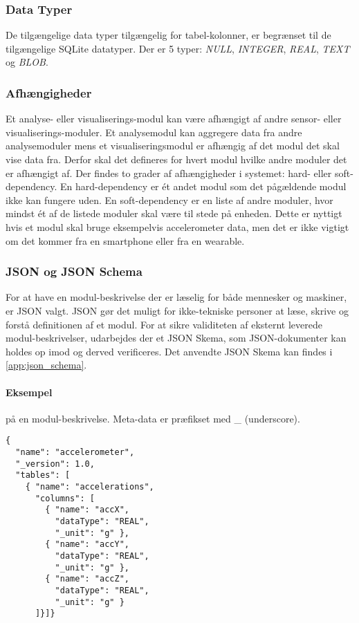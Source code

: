 \subsubsection{Data Typer}
De tilgængelige data typer tilgængelig for tabel-kolonner, er begrænset til de tilgængelige SQLite datatyper.
Der er 5 typer: \textit{NULL}, \textit{INTEGER}, \textit{REAL}, \textit{TEXT} og \textit{BLOB}.

\subsubsection{Afhængigheder}
Et analyse- eller visualiserings-modul kan være afhængigt af andre sensor- eller visualiserings-moduler.
Et analysemodul kan aggregere data fra andre analysemoduler mens et visualiseringsmodul er afhængig af det modul det skal vise data fra.
Derfor skal det defineres for hvert modul hvilke andre moduler det er afhængigt af.
Der findes to grader af afhængigheder i systemet: hard- eller soft-dependency.
En hard-dependency er ét andet modul som det pågældende modul ikke kan fungere uden.
En soft-dependency er en liste af andre moduler, hvor mindst ét af de listede moduler skal være til stede på enheden.
Dette er nyttigt hvis et modul skal bruge eksempelvis accelerometer data, men det er ikke vigtigt om det kommer fra en smartphone eller fra en wearable.

\subsubsection{JSON og JSON Schema}
For at have en modul-beskrivelse der er læselig for både mennesker og maskiner, er JSON valgt.
JSON gør det muligt for ikke-tekniske personer at læse, skrive og forstå definitionen af et modul.
For at sikre validiteten af eksternt leverede modul-beskrivelser, udarbejdes der et JSON Skema, som JSON-dokumenter kan holdes op imod og derved verificeres.
Det anvendte JSON Skema kan findes i \cref{app:json_schema}.

\paragraph{Eksempel} på en modul-beskrivelse.
Meta-data er præfikset med \_ (underscore).
\begin{lstlisting}
{
  "name": "accelerometer",
  "_version": 1.0,
  "tables": [
    { "name": "accelerations",
      "columns": [
        { "name": "accX",
          "dataType": "REAL",
          "_unit": "g" },
        { "name": "accY",
          "dataType": "REAL",
          "_unit": "g" },
        { "name": "accZ",
          "dataType": "REAL",
          "_unit": "g" }
      ]}]}
\end{lstlisting}

